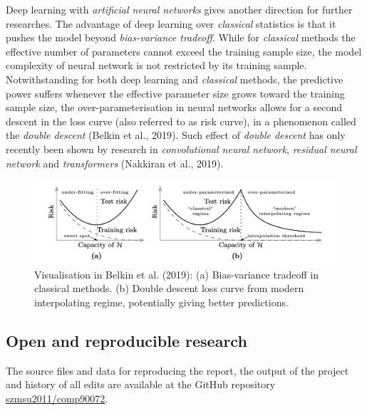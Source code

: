 \documentclass[
]{article}
\begin{document}
Deep learning with \emph{artificial neural networks} gives another
direction for further researches. The advantage of deep learning over
\emph{classical} statistics is that it pushes the model beyond
\emph{bias-variance tradeoff}. While for \emph{classical} methods the
effective number of parameters cannot exceed the training sample size,
the model complexity of neural network is not restricted by its training
sample. Notwithstanding for both deep learning and \emph{classical}
methods, the predictive power suffers whenever the effective parameter
size grows toward the training sample size, the over-parameterisation in
neural networks allows for a second descent in the loss curve (also
referred to as risk curve), in a phenomenon called the \emph{double
descent} (Belkin et al., 2019). Such effect of \emph{double descent} has
only recently been shown by research in \emph{convolutional neural
network}, \emph{residual neural network} and \emph{transformers}
(Nakkiran et al., 2019).

\begin{figure}

{\centering \includegraphics[width=1\linewidth]{figure/ddd} 

}

\caption{Visualisation in Belkin et al. (2019): (a) Bias-variance tradeoff in classical methods. (b) Double descent loss curve from modern interpolating regime, potentially giving better predictions.}\label{fig:ddd}
\end{figure}

\hypertarget{open-and-reproducible-research}{%
\subsection{Open and reproducible
research}\label{open-and-reproducible-research}}

The source files and data for reproducing the report, the output of the
project and history of all edits are available at the GitHub repository
\href{https://github.com/szmsu2011/comp90072}{szmsu2011/comp90072}.

\newpage
\end{document}
